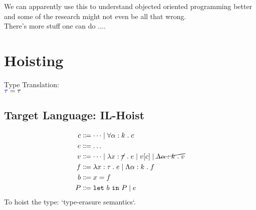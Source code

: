 We can apparently use this to understand objected oriented programming better
and some of the research might not even be all that wrong. \\

There's more stuff one can do $\dots$. \\


\section{Hoisting}
Type Translation: \\
$\textcolor{blue}{\tau} = \tau$ \\

\subsection{Target Language: IL-Hoist}
\begin{align*}
c & \bnfdef \dots \bnfalt \forall\bind{\alpha \of k}{c} \\
e & \bnfdef \dots \\
v & \bnfdef \dots \bnfalt \lambda\bind{x \of \cancel{\tau}}{e}
    \bnfalt v[c] \bnfalt \cancel{\Lambda\bind{\alpha \of k}{v}} \\
f & \bnfdef \lambda\bind{x \of \tau}{e} \bnfalt \Lambda\bind{\alpha \of k}{f} \\
b & \bnfdef x \mathrel{=} f \\
P & \bnfdef \texttt{let}~b~\texttt{in}~P \bnfalt e \\
\end{align*}
To hoist the type: `type-erasure semantics`.

